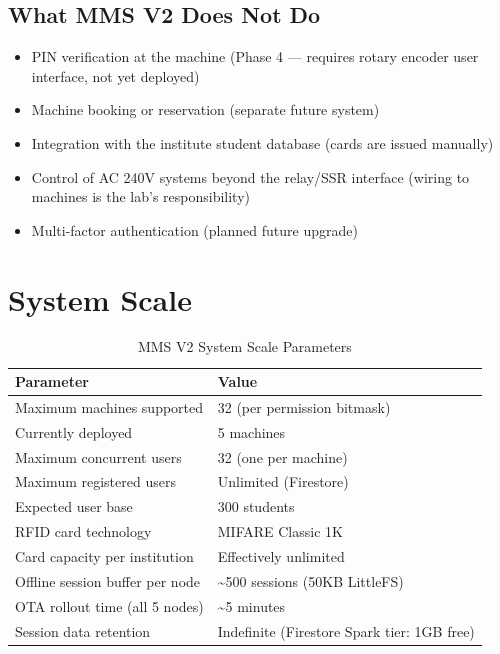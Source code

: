 \subsection{What MMS V2 Does Not Do}

\begin{itemize}[leftmargin=1.5em]
    \item PIN verification at the machine (Phase 4 — requires rotary encoder user interface, not yet deployed)
    \item Machine booking or reservation (separate future system)
    \item Integration with the institute student database (cards are issued manually)
    \item Control of AC 240V systems beyond the relay/SSR interface (wiring to machines is the lab's responsibility)
    \item Multi-factor authentication (planned future upgrade)
\end{itemize}

\section{System Scale}

\begin{table}[H]
\centering
\caption{MMS V2 System Scale Parameters}
\begin{tabular}{L{6cm}L{8cm}}
\toprule
\textbf{Parameter} & \textbf{Value} \\
\midrule
Maximum machines supported & 32 (per permission bitmask) \\
Currently deployed & 5 machines \\
Maximum concurrent users & 32 (one per machine) \\
Maximum registered users & Unlimited (Firestore) \\
Expected user base & 300 students \\
RFID card technology & MIFARE Classic 1K \\
Card capacity per institution & Effectively unlimited \\
Offline session buffer per node & \textasciitilde{}500 sessions (50KB LittleFS) \\
OTA rollout time (all 5 nodes) & \textasciitilde{}5 minutes \\
Session data retention & Indefinite (Firestore Spark tier: 1GB free) \\
\bottomrule
\end{tabular}
\end{table}

